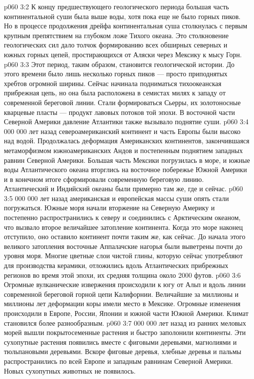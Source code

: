 \vs p060 3:2 К концу предшествующего геологического периода большая часть континентальной суши была выше воды, хотя пока еще не было горных пиков. Но в процессе продолжения дрейфа континентальная суша столкнулась с первым крупным препятствием на глубоком ложе Тихого океана. Это столкновение геологических сил дало толчок формированию всех обширных северных и южных горных цепей, простирающихся от Аляски через Мексику к мысу Горн.
\vs p060 3:3 Этот период, таким образом, становится  геологической истории. До этого времени было лишь несколько горных пиков --- просто приподнятых хребтов огромной ширины. Сейчас начинала подниматься тихоокеанская прибрежная цепь, но она была расположена в семистах милях к западу от современной береговой линии. Стали формироваться Сьерры, их золотоносные кварцевые пласты --- продукт лавовых потоков той эпохи. В восточной части Северной Америки давление Атлантики также вызывало поднятие суши.
\vs p060 3:4  000 000 лет назад североамериканский континент и часть Европы были высоко над водой. Продолжалась деформация Американских континентов, закончившаяся метаморфизмом южноамериканских Андов и постепенным поднятием западных равнин Северной Америки. Большая часть Мексики погрузилась в море, и южные воды Атлантического океана вторглись на восточное побережье Южной Америки и в конечном итоге сформировали современную береговую линию. Атлантический и Индийский океаны были примерно там же, где и сейчас.
\vs p060 3:5  000 000 лет назад американская и европейская массы суши опять стали погружаться. Южные моря начали вторжение на Северную Америку и постепенно распространились к северу и соединились с Арктическим океаном, что вызвало второе величайшее затопление континента. Когда это море наконец отступило, оно оставило континент почти таким же, как сейчас. До начала этого великого затопления восточные Аппалачские нагорья были выветрены почти до уровня моря. Многие цветные слои чистой глины, которую сейчас употребляют для производства керамики, отложились вдоль Атлантических прибрежных регионов во время этой эпохи, их средняя толщина около 2000 футов.
\vs p060 3:6 Огромные вулканические извержения происходили к югу от Альп и вдоль линии современной береговой горной цепи Калифорнии. Величайшие за миллионы и миллионы лет деформации коры имели место в Мексике. Огромные изменения происходили в Европе, России, Японии и южной части Южной Америки. Климат становился более разнообразным.
\vs p060 3:7  000 000 лет назад из ранних меловых морей вышли покрытосеменные растения и быстро заполонили континенты. Эти сухопутные растения  появились вместе с фиговыми деревьями, магнолиями и тюльпановыми деревьями. Вскоре фиговые деревья, хлебные деревья и пальмы распространились по всей Европе и западным равнинам Северной Америки. Новых сухопутных животных не появилось.
